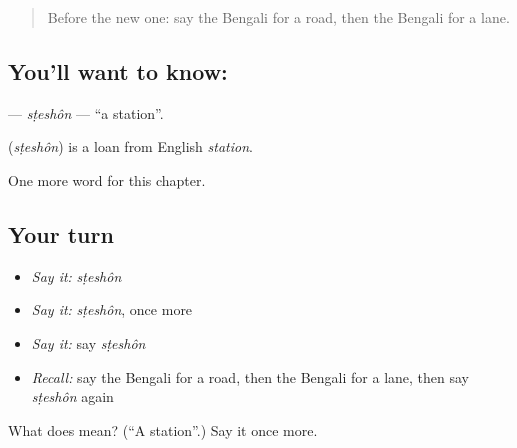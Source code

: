 \label{lesson:BN-C82-steshon}



\begin{quote}
Before the new one: say the Bengali for a road, then the Bengali for a lane.
\end{quote}

\subsection*{You'll want to know: }
\textbf{} — \emph{sṭeshôn} — \textquotedblleft{}a station\textquotedblright{}.

\begin{cousinweb}
\textbf{} (\emph{sṭeshôn}) is a loan from English \emph{station}.
\end{cousinweb}

\begin{grammarlens}[title={What you've built}]
One more word for this chapter.
\end{grammarlens}

\subsection*{Your turn}
\begin{itemize}
\raggedright
  \item \emph{Say it:} \emph{sṭeshôn}
  \item \emph{Say it:} \emph{sṭeshôn}, once more
  \item \emph{Say it:} say \emph{sṭeshôn}
  \item \emph{Recall:} say the Bengali for a road, then the Bengali for a lane, then say \emph{sṭeshôn} again
\end{itemize}

\begin{tcolorbox}[breakable,colback=teal!4,colframe=teal!35!black,title={Before you move on}]
What does  mean? (\textquotedblleft{}A station\textquotedblright{}.) Say it once more.
\end{tcolorbox}
